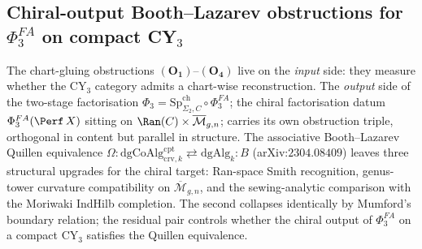 \subsection{Chiral-output Booth--Lazarev obstructions for $\Phi^{FA}_3$
on compact CY$_3$}
\label{sec:chiral-output-bl-obstructions}

The chart-gluing obstructions $(\mathbf{O_1})$--$(\mathbf{O_4})$ live on
the \emph{input} side: they measure whether the CY$_3$ category admits a
chart-wise reconstruction. The \emph{output} side of the two-stage
factorisation $\Phi_3 = \mathrm{Sp}^{\mathrm{ch}}_{\Sigma_2, C} \circ
\Phi^{FA}_3$; the chiral factorisation datum
$\Phi^{FA}_3(\Perf\,X)$ sitting on
$\Ran(C) \times \overline{\mathcal{M}}_{g, n}$; carries its own
obstruction triple, orthogonal in content but parallel in structure.
\providecommand{\crv}{\mathrm{crv}}%
\providecommand{\cpt}{\mathrm{cpt}}%
\providecommand{\dgAlg}{\mathrm{dgAlg}}%
\providecommand{\dgCoAlg}{\mathrm{dgCoAlg}}%
The associative Booth--Lazarev Quillen equivalence
$\Omega : \dgCoAlg^{\cpt}_{\crv, k} \rightleftarrows \dgAlg_k : B$
(arXiv:$2304.08409$) leaves three structural upgrades for the chiral
target: Ran-space Smith recognition, genus-tower curvature
compatibility on $\overline{\mathcal{M}}_{g, n}$, and the
sewing-analytic comparison with the Moriwaki IndHilb completion. The
second collapses identically by Mumford's boundary relation; the
residual pair controls whether the chiral output of $\Phi^{FA}_3$ on
a compact CY$_3$ satisfies the Quillen equivalence.

\providecommand{\kch}{\kappa_{\mathrm{ch}}}
\providecommand{\crv}{\mathrm{crv}}
\providecommand{\cpt}{\mathrm{cpt}}
\providecommand{\dgAlg}{\mathrm{dgAlg}}
\providecommand{\dgCoAlg}{\mathrm{dgCoAlg}}
\providecommand{\Dco}{D^{\mathrm{co}}}
\providecommand{\FactCoAlg}{\mathrm{FactCoAlg}}
\providecommand{\FactLie}{\mathrm{FactLie}}
\providecommand{\IndHilb}{\mathrm{IndHilb}}
\providecommand{\Mbar}{\overline{\mathcal{M}}}


